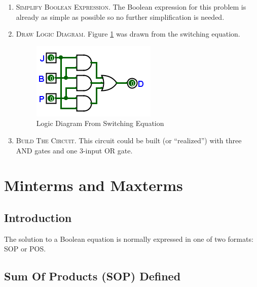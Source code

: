 \begin{enumerate}
  \item \textsc{Simplify Boolean Expression}. The Boolean expression for this problem is already as simple as possible so no further simplification is needed. 
  
  \item \textsc{Draw Logic Diagram}. Figure \ref{fig:05_01} was drawn from the switching equation.
  
	\begin{figure}[H]
		\centering
		\includegraphics[width=\maxwidth{.95\linewidth}]{gfx/05_01}
		\caption{Logic Diagram From Switching Equation}
		\label{fig:05_01}
	\end{figure}
  
  \item \textsc{Build The Circuit}. This circuit could be built (or ``realized'') with three \textsf{AND}  gates and one 3-input \textsf{OR}  gate. 
  
\end{enumerate}

\section{Minterms and Maxterms}
\label{05:sec:minterms_and_maxterms}

\subsection{Introduction}
\label{05:subsec:introduction_to_minterms_and_maxterms}

The solution to a Boolean equation is normally expressed in one of two formats: \ac{SOP} or \ac{POS}.

\subsection{Sum Of Products (SOP) Defined}
\label{05:subsec:sum_of_products_sop_defined}

